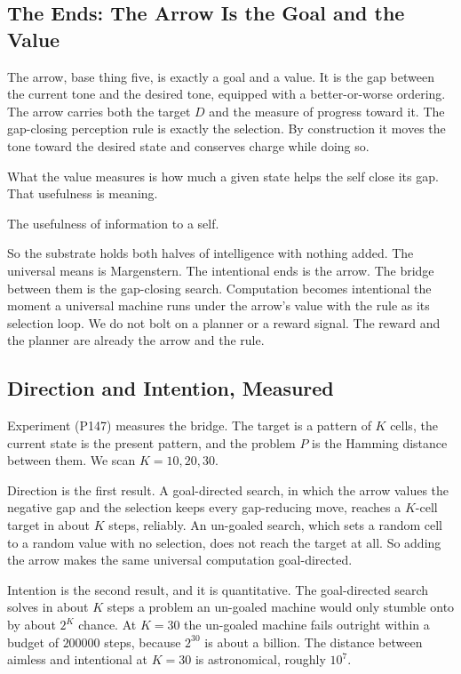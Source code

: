 \subsection{The Ends: The Arrow Is the Goal and the Value}

The arrow, base thing five, is exactly a goal and a value. It is the gap between the current tone and the desired tone, equipped with a better-or-worse ordering. The arrow carries both the target $D$ and the measure of progress toward it. The gap-closing perception rule is exactly the selection. By construction it moves the tone toward the desired state and conserves charge while doing so.

What the value measures is how much a given state helps the self close its gap. That usefulness is meaning.

\begin{definition}[Meaning]
The usefulness of information to a self.
\end{definition}

So the substrate holds both halves of intelligence with nothing added. The universal means is Margenstern. The intentional ends is the arrow. The bridge between them is the gap-closing search. Computation becomes intentional the moment a universal machine runs under the arrow's value with the rule as its selection loop. We do not bolt on a planner or a reward signal. The reward and the planner are already the arrow and the rule.

\subsection{Direction and Intention, Measured}

Experiment (P147) measures the bridge. The target is a pattern of $K$ cells, the current state is the present pattern, and the problem $P$ is the Hamming distance between them. We scan $K = 10, 20, 30$.

Direction is the first result. A goal-directed search, in which the arrow values the negative gap and the selection keeps every gap-reducing move, reaches a $K$-cell target in about $K$ steps, reliably. An un-goaled search, which sets a random cell to a random value with no selection, does not reach the target at all. So adding the arrow makes the same universal computation goal-directed.

Intention is the second result, and it is quantitative. The goal-directed search solves in about $K$ steps a problem an un-goaled machine would only stumble onto by about $2^{K}$ chance. At $K = 30$ the un-goaled machine fails outright within a budget of $200000$ steps, because $2^{30}$ is about a billion. The distance between aimless and intentional at $K = 30$ is astronomical, roughly $10^{7}$.

